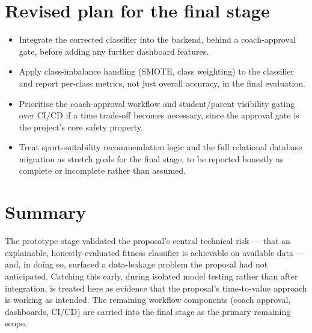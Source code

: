 \documentclass[11pt,a4paper]{article}
\begin{document}
\section{Revised plan for the final stage}
\begin{itemize}[leftmargin=0.7cm]
    \item Integrate the corrected classifier into the backend, behind a coach-approval gate, before adding any further dashboard features.
    \item Apply class-imbalance handling (SMOTE, class weighting) to the classifier and report per-class metrics, not just overall accuracy, in the final evaluation.
    \item Prioritise the coach-approval workflow and student/parent visibility gating over CI/CD if a time trade-off becomes necessary, since the approval gate is the project's core safety property.
    \item Treat sport-suitability recommendation logic and the full relational database migration as stretch goals for the final stage, to be reported honestly as complete or incomplete rather than assumed.
\end{itemize}

\section{Summary}
The prototype stage validated the proposal's central
technical risk --- that an explainable, honestly-evaluated
fitness classifier is achievable on available data --- and,
in doing so, surfaced a data-leakage problem the proposal
had not anticipated. Catching this early, during isolated
model testing rather than after integration, is treated
here as evidence that the proposal's time-to-value approach
is working as intended. The remaining workflow components
(coach approval, dashboards, CI/CD) are carried into the
final stage as the primary remaining scope.
\end{document}
